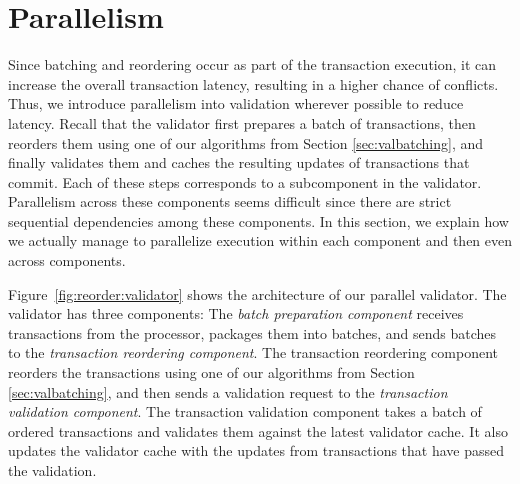 

\section{Parallelism}
\label{sec:parallel}


\label{subsec:validator_reordering:parallel}
Since batching and reordering occur as part of the transaction execution, it can increase the overall transaction latency, 
resulting in a higher chance of conflicts. Thus, we introduce parallelism into validation wherever possible to reduce latency.
Recall that the validator first prepares a batch of transactions, then reorders them using one of our algorithms from Section \ref{sec:valbatching},  
and finally validates them and caches the resulting updates of transactions that commit.
 Each of these steps corresponds to a subcomponent in the validator. Parallelism across these components seems difficult since there are strict sequential dependencies among these components. In this section, we explain how we actually manage to parallelize execution within each component and then even across components.


Figure~\ref{fig:reorder:validator} shows the architecture of our parallel validator. The validator has three components: 
The \emph{batch preparation component} receives transactions from the processor, packages them into batches, and sends batches to the \emph{transaction reordering component}. The transaction reordering component reorders the transactions using one of our algorithms from Section \ref{sec:valbatching}, and then sends a validation request to the \emph{transaction validation component}. The transaction validation component takes a batch of ordered 
transactions
and validates them against the latest validator cache. It also updates the validator cache with the updates from transactions that have passed the validation. 

